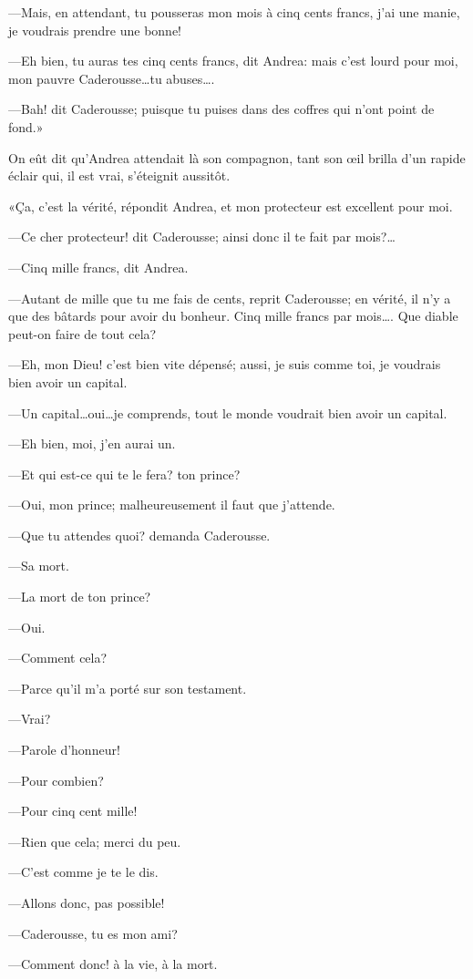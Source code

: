 —Mais, en attendant, tu pousseras mon mois à cinq cents francs, j'ai une manie, je voudrais prendre une bonne! 

—Eh bien, tu auras tes cinq cents francs, dit Andrea: mais c'est lourd pour moi, mon pauvre Caderousse\dots tu abuses\dots. 

—Bah! dit Caderousse; puisque tu puises dans des coffres qui n'ont point de fond.» 

On eût dit qu'Andrea attendait là son compagnon, tant son œil brilla d'un rapide éclair qui, il est vrai, s'éteignit aussitôt. 

«Ça, c'est la vérité, répondit Andrea, et mon protecteur est excellent pour moi. 

—Ce cher protecteur! dit Caderousse; ainsi donc il te fait par mois?\dots 

—Cinq mille francs, dit Andrea. 

—Autant de mille que tu me fais de cents, reprit Caderousse; en vérité, il n'y a que des bâtards pour avoir du bonheur. Cinq mille francs par mois\dots. Que diable peut-on faire de tout cela? 

—Eh, mon Dieu! c'est bien vite dépensé; aussi, je suis comme toi, je voudrais bien avoir un capital. 

—Un capital\dots oui\dots je comprends, tout le monde voudrait bien avoir un capital. 

—Eh bien, moi, j'en aurai un. 

—Et qui est-ce qui te le fera? ton prince? 

—Oui, mon prince; malheureusement il faut que j'attende. 

—Que tu attendes quoi? demanda Caderousse. 

—Sa mort.  

—La mort de ton prince? 

—Oui. 

—Comment cela? 

—Parce qu'il m'a porté sur son testament. 

—Vrai? 

—Parole d'honneur! 

—Pour combien? 

—Pour cinq cent mille! 

—Rien que cela; merci du peu. 

—C'est comme je te le dis. 

—Allons donc, pas possible! 

—Caderousse, tu es mon ami? 

—Comment donc! à la vie, à la mort. 

